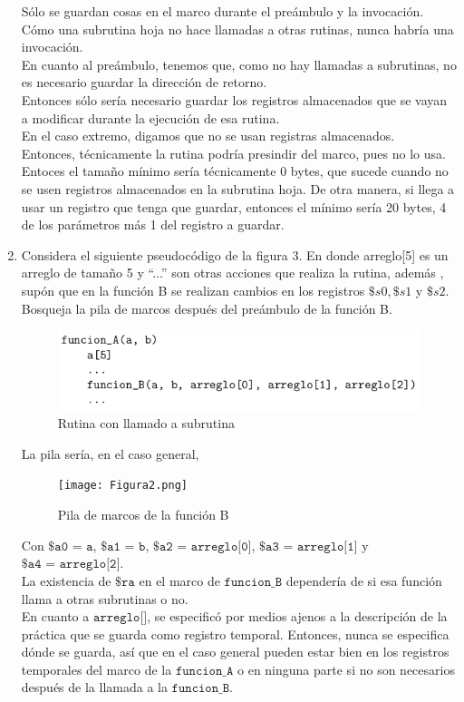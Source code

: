 \documentclass{article}
\begin{document}
\begin{enumerate}
{\begin{enumerate}
{			Sólo se guardan cosas en el marco durante el preámbulo y la 
			invocación.\\
			Cómo una subrutina hoja no hace llamadas a otras rutinas, nunca 
			habría una invocación.\\
			En cuanto al preámbulo, tenemos que, como no hay llamadas a
			subrutinas, no es necesario guardar la dirección de retorno.\\
			Entonces sólo sería necesario guardar los registros almacenados que 
			se vayan a modificar durante la ejecución de esa rutina.\\
			En el caso extremo, digamos que no se usan registras almacenados.\\
			Entonces, técnicamente la rutina podría presindir del marco, pues no
			lo usa. Entoces el tamaño mínimo sería técnicamente 0 bytes, que
			sucede cuando no se usen registros almacenados en la subrutina hoja.
			De otra manera, si llega a usar un registro que tenga que guardar,
			entonces el mínimo sería 20 bytes, 4 de los parámetros más 1 del
			registro a guardar.
			}
		\end{enumerate}
		
	
	}
	
		
	\item{
	Considera el siguiente pseudocódigo de la figura 3. En donde arreglo[5] es un
	arreglo de tamaño 5 y “...” son otras acciones que realiza la rutina, además
	, supón que en la función B se realizan cambios en los registros $\$s0,
	\$s1$ y $\$s2$. Bosqueja la pila de marcos después del preámbulo de la 
	función B.
	
	\begin{figure}[H]
		\centering
		\includegraphics[scale=0.5]{Figura1.png}
		\caption{Rutina con llamado a subrutina}
	\end{figure}

	La pila sería, en el caso general,
	
	\begin{figure}[H]
		\centering
		\texttt{[image: Figura2.png]}
		\caption{Pila de marcos de la función B}
	\end{figure}
	}
	Con $\texttt{\$a0 = a}$, $\texttt{\$a1 = b}$, $\texttt{\$a2 = arreglo[0]}$,
	$\texttt{\$a3 = arreglo[1]}$ y $\texttt{\$a4 = arreglo[2]}$.\\
	La existencia de $\texttt{\$ra}$ en el marco de $\texttt{funcion\_B}$
	dependería de si esa función llama a otras subrutinas o no.\\
	En cuanto a $\texttt{arreglo[]}$, se especificó por medios ajenos a la
	descripción de la práctica que se guarda como registro temporal. Entonces, 
	nunca se especifica dónde se guarda, así que en el caso general pueden estar
	bien en los registros temporales del marco de la $\texttt{funcion\_A}$ o en 
	ninguna parte si no son necesarios después de la llamada a la 
	$\texttt{funcion\_B}$.
    \end{enumerate}
\end{document}

